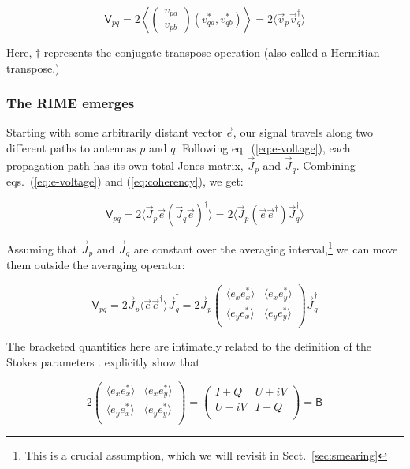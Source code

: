 \documentclass[]{aa}
\newcommand{\matrixtt}[4]{\left( \begin{array}{cc}#1&#2\\#3&#4\\\end{array} \right)}
\newcommand{\jones}[2]{\vec {#1}_{#2}}
\newcommand{\jonesT}[2]{\vec {#1}^\dagger_{#2}}
\newcommand{\coh}[2]{\mathsf{{#1}}_{{#2}}}
\begin{document}
\begin{equation}\label{eq:coherency}
\coh{V}{pq} = 2 \left<\left( \begin{array}{c}v_{pa}\\v_{pb}\end{array} \right) (v^*_{qa},v^*_{qb}) \right > = 2 \langle \vec v_p \vec v^\dagger_q \rangle
\end{equation}

Here, $\dagger$ represents the conjugate transpose operation (also called a Hermitian transpose.)

\subsubsection{\label{sec:RIME-emerges}The RIME emerges}

Starting with some arbitrarily distant vector $\vec e$, our signal travels along two different paths to antennas $p$ and $q$. Following eq.~(\ref{eq:e-voltage}), each propagation path has its own total Jones matrix, $\jones{J}{p}$ and $\jones{J}{q}$. Combining eqs.~(\ref{eq:e-voltage}) and (\ref{eq:coherency}), we get:

    \begin{equation}\label{eq:corr1}
    \coh{V}{pq} = 2 \langle  \jones{J}{p} \vec e ( \jones{J}{q} \vec e )^\dagger \rangle  = 2 \langle  \jones{J}{p} (\vec e \vec e^\dagger) \jonesT{J}{q} \rangle 
    \end{equation}

Assuming that $\jones{J}{p}$ and $\jones{J}{q}$ are constant over the averaging interval,\footnote{This is a crucial assumption, which we will revisit in Sect.~\ref{sec:smearing}} we can move them outside the averaging operator:

    \begin{equation}\label{eq:corr2}
    \coh{V}{pq} = 2 \jones{J}{p} \langle  \vec e \vec e^\dagger \rangle  \jonesT{J}{q} = 
    2 \jones{J}{p} 
    \matrixtt{\langle e_x e^*_x\rangle }{\langle e_x e^*_y\rangle }{\langle e_y e^*_x\rangle }{\langle e_y e^*_y\rangle }
    \jonesT{J}{q}
    \end{equation}

The bracketed quantities here are intimately related to the definition of the Stokes parameters \citep{born-wolf,tms}. \citet{ME3} explicitly show that

    \begin{equation}\label{eq:IQUV}
    2 
    \matrixtt{\langle e_x e^*_x\rangle }{\langle e_x e^*_y\rangle }{\langle e_y e^*_x\rangle }{\langle e_y e^*_y\rangle }
    = 
    \matrixtt{I+Q}{U+iV}{U-iV}{I-Q} = \coh{B}{}
    \end{equation}
\end{document}
